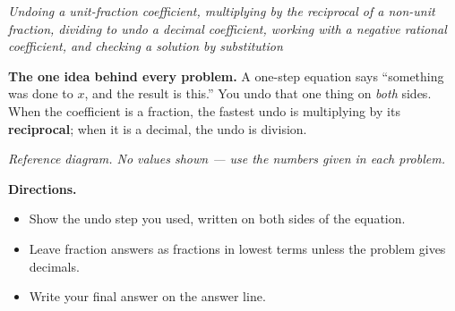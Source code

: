 \documentclass[12pt]{article}
\begin{document}

\begin{center}
\textit{Undoing a unit-fraction coefficient, multiplying by the reciprocal of a
non-unit fraction, dividing to undo a decimal coefficient, working with a
negative rational coefficient, and checking a solution by substitution}
\end{center}

\noindent\textbf{The one idea behind every problem.} A one-step equation says
``something was done to $x$, and the result is this.'' You undo that one thing
on \emph{both} sides. When the coefficient is a fraction, the fastest undo is
multiplying by its \textbf{reciprocal}; when it is a decimal, the undo is
division.

\begin{center}

\smallskip
\small\textit{Reference diagram. No values shown --- use the numbers given in
each problem.}\normalsize
\end{center}

\noindent\textbf{Directions.}
\begin{itemize}[leftmargin=1.2cm, itemsep=2pt, topsep=2pt]
\item Show the undo step you used, written on both sides of the equation.
\item Leave fraction answers as fractions in lowest terms unless the problem
gives decimals.
\item Write your final answer on the answer line.
\end{itemize}

\end{document}
